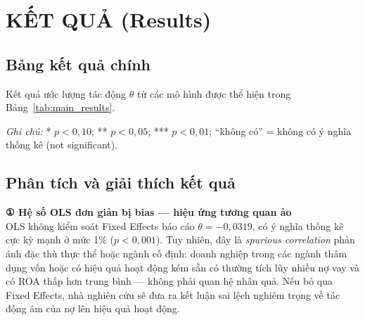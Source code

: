 \documentclass[12pt,a4paper]{article}
\begin{document}
\section{KẾT QUẢ (Results)}

\subsection{Bảng kết quả chính}
Kết quả ước lượng tác động $\theta$ từ các mô hình được thể hiện trong Bảng~\ref{tab:main_results}.

\begin{table}[htbp]
\centering
\caption{Kết quả ước lượng tác động nhân quả $\theta$ trên các mô hình}
\label{tab:main_results}
\begin{flushleft}
\small
\textit{Ghi chú:} * $p < 0,10$; ** $p < 0,05$; *** $p < 0,01$; ``không có'' = không có ý nghĩa thống kê (not significant).
\end{flushleft}
\end{table}

\subsection{Phân tích và giải thích kết quả}

\noindent\textbf{① Hệ số OLS đơn giản bị bias --- hiệu ứng tương quan ảo} \\
OLS không kiểm soát Fixed Effects báo cáo $\theta = -0,0319$, có ý nghĩa thống kê cực kỳ mạnh ở mức 1\% ($p < 0,001$). Tuy nhiên, đây là \textit{spurious correlation} phản ánh đặc thù thực thể hoặc ngành cố định: doanh nghiệp trong các ngành thâm dụng vốn hoặc có hiệu quả hoạt động kém sẵn có thường tích lũy nhiều nợ vay và có ROA thấp hơn trung bình --- không phải quan hệ nhân quả. Nếu bỏ qua Fixed Effects, nhà nghiên cứu sẽ đưa ra kết luận sai lệch nghiêm trọng về tác động âm của nợ lên hiệu quả hoạt động.
\end{document}
